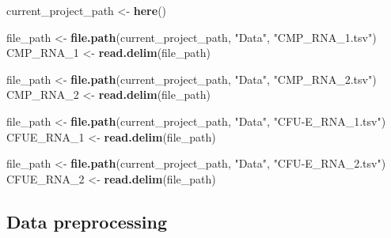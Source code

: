 \documentclass[
]{article}
\newenvironment{Shaded}{\begin{snugshade}}{\end{snugshade}}
\newcommand{\FunctionTok}[1]{\textcolor[rgb]{0.13,0.29,0.53}{\textbf{#1}}}
\newcommand{\NormalTok}[1]{#1}
\newcommand{\OtherTok}[1]{\textcolor[rgb]{0.56,0.35,0.01}{#1}}
\newcommand{\StringTok}[1]{\textcolor[rgb]{0.31,0.60,0.02}{#1}}
\begin{document}
\begin{Shaded}
\begin{Highlighting}[]
\NormalTok{current\_project\_path }\OtherTok{\textless{}{-}} \FunctionTok{here}\NormalTok{()}

\NormalTok{file\_path }\OtherTok{\textless{}{-}} \FunctionTok{file.path}\NormalTok{(current\_project\_path, }\StringTok{"Data"}\NormalTok{, }\StringTok{"CMP\_RNA\_1.tsv"}\NormalTok{)}
\NormalTok{CMP\_RNA\_1 }\OtherTok{\textless{}{-}} \FunctionTok{read.delim}\NormalTok{(file\_path)}

\NormalTok{file\_path }\OtherTok{\textless{}{-}} \FunctionTok{file.path}\NormalTok{(current\_project\_path, }\StringTok{"Data"}\NormalTok{, }\StringTok{"CMP\_RNA\_2.tsv"}\NormalTok{)}
\NormalTok{CMP\_RNA\_2 }\OtherTok{\textless{}{-}} \FunctionTok{read.delim}\NormalTok{(file\_path)}

\NormalTok{file\_path }\OtherTok{\textless{}{-}} \FunctionTok{file.path}\NormalTok{(current\_project\_path, }\StringTok{"Data"}\NormalTok{, }\StringTok{"CFU{-}E\_RNA\_1.tsv"}\NormalTok{)}
\NormalTok{CFUE\_RNA\_1 }\OtherTok{\textless{}{-}} \FunctionTok{read.delim}\NormalTok{(file\_path)}

\NormalTok{file\_path }\OtherTok{\textless{}{-}} \FunctionTok{file.path}\NormalTok{(current\_project\_path, }\StringTok{"Data"}\NormalTok{, }\StringTok{"CFU{-}E\_RNA\_2.tsv"}\NormalTok{)}
\NormalTok{CFUE\_RNA\_2 }\OtherTok{\textless{}{-}} \FunctionTok{read.delim}\NormalTok{(file\_path)}
\end{Highlighting}
\end{Shaded}

\hypertarget{data-preprocessing}{%
\subsection{Data preprocessing}\label{data-preprocessing}}
\end{document}
